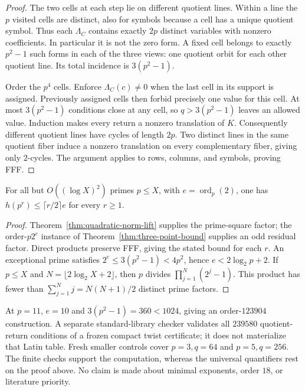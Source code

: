 \begin{proof}
The two cells at each step lie on different quotient lines.  Within a
line the $p$ visited cells are distinct, also for symbols because a cell
has a unique quotient symbol.  Thus each $\Lambda_C$ contains exactly
$2p$ distinct variables with nonzero coefficients.  In particular it is
not the zero form.  A fixed cell belongs to exactly $p^2-1$ such forms
in each of the three views: one quotient orbit for each other quotient
line.  Its total incidence is $3(p^2-1)$.

Order the $p^4$ cells.  Enforce $\Lambda_C(c)\ne0$ when the last cell in
its support is assigned.  Previously assigned cells then forbid precisely
one value for this cell.  At most $3(p^2-1)$ conditions close at any cell,
so $q>3(p^2-1)$ leaves an allowed value.  Induction makes every return
a nonzero translation of $K$.  Consequently different quotient lines
have cycles of length $2p$.  Two distinct lines in the same quotient
fiber induce a nonzero translation on every complementary fiber, giving
only $2$-cycles.  The argument applies to rows, columns, and symbols,
proving FFF.
\end{proof}

\begin{corollary}\label{cor:prime-square-almost-all}
For all but $O((\log X)^2)$ primes $p\leq X$, with
$e=\operatorname{ord}_p(2)$, one has
$h(p^r)\leq\lceil r/2\rceil e$ for every $r\geq1$.
\end{corollary}

\begin{proof}
Theorem~\ref{thm:quadratic-norm-lift} supplies the prime-square factor;
the order-$p2^e$ instance of Theorem~\ref{thm:three-point-bound} supplies
an odd residual factor.  Direct products preserve FFF, giving the stated
bound for each $r$.  An exceptional prime satisfies
$2^e\leq3(p^2-1)<4p^2$, hence $e<2\log_2p+2$.  If $p\leq X$ and
$N=\lfloor2\log_2X+2\rfloor$, then $p$ divides
$\prod_{j=1}^N(2^j-1)$.  This product has fewer than
$\sum_{j=1}^N j=N(N+1)/2$ distinct prime factors.
\end{proof}

At $p=11$, $e=10$ and $3(p^2-1)=360<1024$, giving an order-$123904$
construction.  A separate standard-library checker validates all
$239580$ quotient-return conditions of a frozen compact twist certificate;
it does not materialize that Latin table.  Fresh smaller controls cover
$p=3,q=64$ and $p=5,q=256$.  The finite checks support the computation,
whereas the universal quantifiers rest on the proof above.  No claim is
made about minimal exponents, order $18$, or literature priority.
